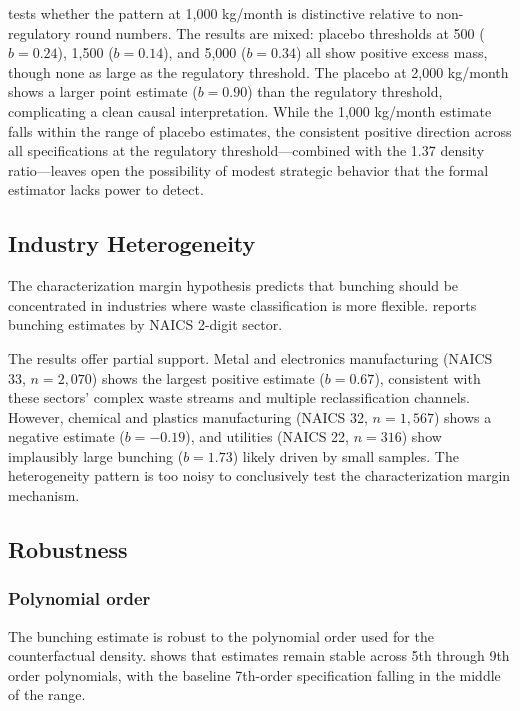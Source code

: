 \documentclass[12pt]{article}
\begin{document}


 tests whether the pattern at 1,000 kg/month is distinctive relative to non-regulatory round numbers. The results are mixed: placebo thresholds at 500 ($b = 0.24$), 1,500 ($b = 0.14$), and 5,000 ($b = 0.34$) all show positive excess mass, though none as large as the regulatory threshold. The placebo at 2,000 kg/month shows a larger point estimate ($b = 0.90$) than the regulatory threshold, complicating a clean causal interpretation. While the 1,000 kg/month estimate falls within the range of placebo estimates, the consistent positive direction across all specifications at the regulatory threshold---combined with the 1.37 density ratio---leaves open the possibility of modest strategic behavior that the formal estimator lacks power to detect.

\subsection{Industry Heterogeneity}



The characterization margin hypothesis predicts that bunching should be concentrated in industries where waste classification is more flexible.  reports bunching estimates by NAICS 2-digit sector.

The results offer partial support. Metal and electronics manufacturing (NAICS 33, $n = 2{,}070$) shows the largest positive estimate ($b = 0.67$), consistent with these sectors' complex waste streams and multiple reclassification channels. However, chemical and plastics manufacturing (NAICS 32, $n = 1{,}567$) shows a negative estimate ($b = -0.19$), and utilities (NAICS 22, $n = 316$) show implausibly large bunching ($b = 1.73$) likely driven by small samples. The heterogeneity pattern is too noisy to conclusively test the characterization margin mechanism.

\subsection{Robustness}



\subsubsection*{Polynomial order} The bunching estimate is robust to the polynomial order used for the counterfactual density.  shows that estimates remain stable across 5th through 9th order polynomials, with the baseline 7th-order specification falling in the middle of the range.
\end{document}
